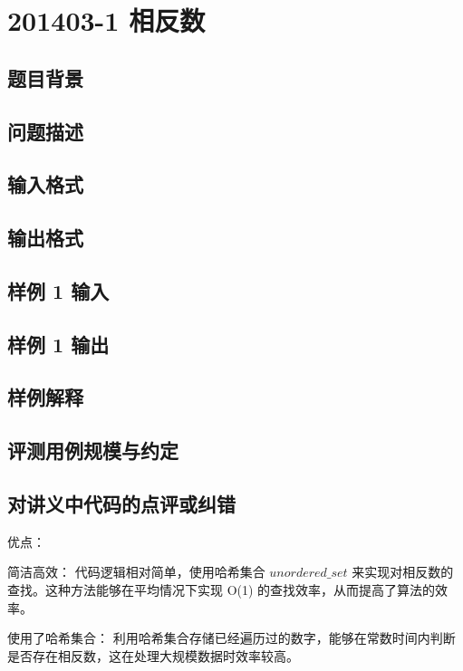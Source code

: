 \section{201403-1 相反数}

\subsection{题目背景}

\subsection{问题描述}

\subsection{输入格式}

\subsection{输出格式}

\subsection{样例 1 输入}

\subsection{样例 1 输出}

\subsection{样例解释}

\subsection{评测用例规模与约定}

\subsection{对讲义中代码的点评或纠错}
 
优点：

简洁高效： 代码逻辑相对简单，使用哈希集合 $unordered\_set$ 来实现对相反数的查找。这种方法能够在平均情况下实现 O(1) 的查找效率，从而提高了算法的效率。

使用了哈希集合： 利用哈希集合存储已经遍历过的数字，能够在常数时间内判断是否存在相反数，这在处理大规模数据时效率较高。

